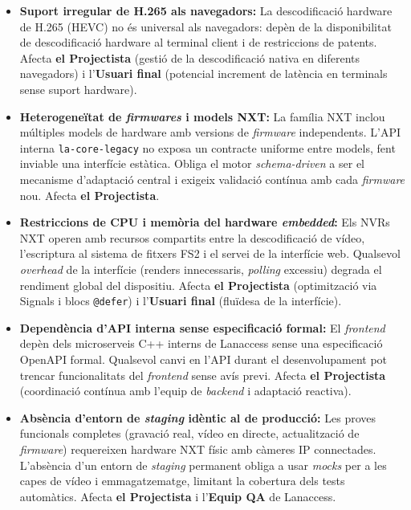 \begin{itemize}
  \item \textbf{Suport irregular de H.265 als navegadors:} La descodificació hardware de H.265 (HEVC) no és universal als navegadors: depèn de la disponibilitat de descodificació hardware al terminal client i de restriccions de patents. Afecta \textbf{el Projectista} (gestió de la descodificació nativa en diferents navegadors) i l'\textbf{Usuari final} (potencial increment de latència en terminals sense suport hardware).

  \item \textbf{Heterogeneïtat de \textit{firmwares} i models NXT:} La família NXT inclou múltiples models de hardware amb versions de \textit{firmware} independents. L'API interna \texttt{la-core-legacy} no exposa un contracte uniforme entre models, fent inviable una interfície estàtica. Obliga el motor \textit{schema-driven} a ser el mecanisme d'adaptació central i exigeix validació contínua amb cada \textit{firmware} nou. Afecta \textbf{el Projectista}.

  \item \textbf{Restriccions de CPU i memòria del hardware \textit{embedded}:} Els NVRs NXT operen amb recursos compartits entre la descodificació de vídeo, l'escriptura al sistema de fitxers FS2 i el servei de la interfície web. Qualsevol \textit{overhead} de la interfície (renders innecessaris, \textit{polling} excessiu) degrada el rendiment global del dispositiu. Afecta \textbf{el Projectista} (optimització via Signals i blocs \texttt{@defer}) i l'\textbf{Usuari final} (fluïdesa de la interfície).

  \item \textbf{Dependència d'API interna sense especificació formal:} El \textit{frontend} depèn dels microserveis C++ interns de Lanaccess sense una especificació OpenAPI formal. Qualsevol canvi en l'API durant el desenvolupament pot trencar funcionalitats del \textit{frontend} sense avís previ. Afecta \textbf{el Projectista} (coordinació contínua amb l'equip de \textit{backend} i adaptació reactiva).

  \item \textbf{Absència d'entorn de \textit{staging} idèntic al de producció:} Les proves funcionals completes (gravació real, vídeo en directe, actualització de \textit{firmware}) requereixen hardware NXT físic amb càmeres IP connectades. L'absència d'un entorn de \textit{staging} permanent obliga a usar \textit{mocks} per a les capes de vídeo i emmagatzematge, limitant la cobertura dels tests automàtics. Afecta \textbf{el Projectista} i l'\textbf{Equip QA} de Lanaccess.
\end{itemize}


